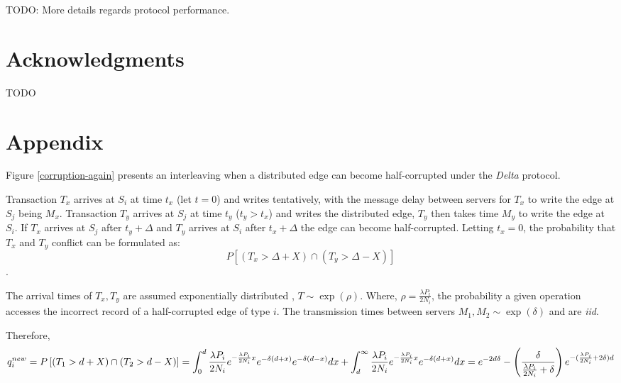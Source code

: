 \documentclass[sigplan,10pt]{acmart}
\begin{document}
TODO: More details regards protocol performance.
\section{Acknowledgments}

TODO


\appendix
\section{Appendix}

Figure \ref{corruption-again} presents an interleaving when a distributed edge can become half-corrupted under the \emph{Delta} protocol.

Transaction $T_x$ arrives at $S_i$ at time $t_x$ (let $t=0$) and writes tentatively, with the message delay between servers for $T_x$ to write the edge at $S_j$ being $M_x$. Transaction $T_y$ arrives at $S_j$ at time $t_y$ ($t_y > t_x$) and writes the distributed edge, $T_y$ then takes time $M_y$ to write the edge at $S_i$. If $T_x$ arrives at $S_j$ after $t_y + \Delta$ and $T_y$ arrives at $S_i$ after $t_x + \Delta$ the edge can become half-corrupted. Letting $t_x = 0 $, the probability that $T_x$ and $T_y$ conflict can be formulated as: $$ P \left[ ( T_x >  \Delta + X) \cap (T_y > \Delta-X) \right]$$.

The arrival times of $T_x,T_y$ are assumed exponentially distributed , $T \sim \exp (\rho)$. Where, $ \rho  = \frac{\lambda P_i}{2N_i}$, the probability a given operation accesses the incorrect record of a half-corrupted edge of type $i$. The transmission times between servers $M_1, M_2 \sim \exp (\delta)$ and are \emph{iid}.


Therefore,
\begin{dmath*}
  q^{new}_{i} =  {P \left[ ( T_1 >  d + X) \cap (T_2 > d-X)  \right]} \\
  =  \int_{0}^{d}  \frac{\lambda P_i}{2 N_i} e^{-\frac{\lambda P_i}{2 N_i} x} e^{-\delta (d+x)} e^{-\delta (d-x)} dx + \int_{d}^{\infty} \frac{\lambda P_i}{2 N_i} e^{-\frac{\lambda P_i}{2 N_i} x} e^{-\delta (d+x)} dx  \\
  =  e^{-2 d \delta} - \left( \frac{\delta}{\frac{\lambda P_i}{2 N_i} + \delta} \right) e^{-(\frac{\lambda P_i}{2 N_i}+ 2\delta)d} \\
\end{dmath*}

\end{document}
